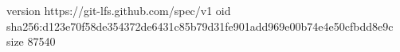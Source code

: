 version https://git-lfs.github.com/spec/v1
oid sha256:d123e70f58de354372de6431c85b79d31fe901add969e00b74e4e50cfbdd8e9c
size 87540

